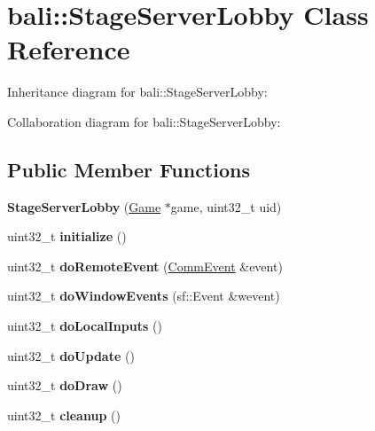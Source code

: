 \hypertarget{classbali_1_1_stage_server_lobby}{\section{bali\-:\-:Stage\-Server\-Lobby Class Reference}
\label{classbali_1_1_stage_server_lobby}
}


Inheritance diagram for bali\-:\-:Stage\-Server\-Lobby\-:


Collaboration diagram for bali\-:\-:Stage\-Server\-Lobby\-:
\subsection*{Public Member Functions}
\begin{DoxyCompactItemize}
\item 
\hypertarget{classbali_1_1_stage_server_lobby_addddc7b7f6ac279455038a8de9b708c3}{{\bfseries Stage\-Server\-Lobby} (\hyperlink{classbali_1_1_game}{Game} $\ast$game, uint32\-\_\-t uid)}\label{classbali_1_1_stage_server_lobby_addddc7b7f6ac279455038a8de9b708c3}

\item 
\hypertarget{classbali_1_1_stage_server_lobby_a3f5362cd37fa8981f20c4b6b6172d1a2}{uint32\-\_\-t {\bfseries initialize} ()}\label{classbali_1_1_stage_server_lobby_a3f5362cd37fa8981f20c4b6b6172d1a2}

\item 
\hypertarget{classbali_1_1_stage_server_lobby_ade103b66506644f514a0f354c1e9cdb2}{uint32\-\_\-t {\bfseries do\-Remote\-Event} (\hyperlink{classbali_1_1_comm_event}{Comm\-Event} \&event)}\label{classbali_1_1_stage_server_lobby_ade103b66506644f514a0f354c1e9cdb2}

\item 
\hypertarget{classbali_1_1_stage_server_lobby_a2aac30b746fe3daef053b0711ba6ec12}{uint32\-\_\-t {\bfseries do\-Window\-Events} (sf\-::\-Event \&wevent)}\label{classbali_1_1_stage_server_lobby_a2aac30b746fe3daef053b0711ba6ec12}

\item 
\hypertarget{classbali_1_1_stage_server_lobby_af164dbb998c7437bc03f2965609ab3e1}{uint32\-\_\-t {\bfseries do\-Local\-Inputs} ()}\label{classbali_1_1_stage_server_lobby_af164dbb998c7437bc03f2965609ab3e1}

\item 
\hypertarget{classbali_1_1_stage_server_lobby_a4e11c9ccfb495bd747bd031d85a1a213}{uint32\-\_\-t {\bfseries do\-Update} ()}\label{classbali_1_1_stage_server_lobby_a4e11c9ccfb495bd747bd031d85a1a213}

\item 
\hypertarget{classbali_1_1_stage_server_lobby_ad503a9565a07f81f448bf52398ab088b}{uint32\-\_\-t {\bfseries do\-Draw} ()}\label{classbali_1_1_stage_server_lobby_ad503a9565a07f81f448bf52398ab088b}

\item 
\hypertarget{classbali_1_1_stage_server_lobby_a8737af897cf6cae8cc6c781941171621}{uint32\-\_\-t {\bfseries cleanup} ()}\label{classbali_1_1_stage_server_lobby_a8737af897cf6cae8cc6c781941171621}

\end{DoxyCompactItemize}
